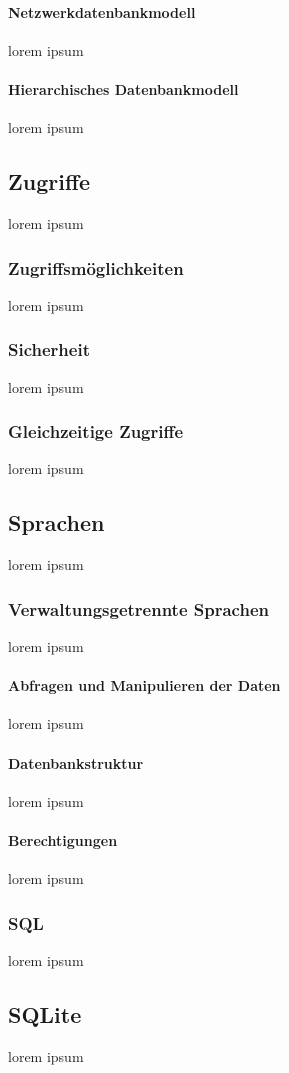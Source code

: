 \documentclass[12pt,a4paper]{report}
\begin{document}
\paragraph{Netzwerkdatenbankmodell}
lorem ipsum
\paragraph{Hierarchisches Datenbankmodell}
lorem ipsum
\subsection{Zugriffe}
lorem ipsum
\subsubsection{Zugriffsmöglichkeiten}
lorem ipsum
\subsubsection{Sicherheit}
lorem ipsum
\subsubsection{Gleichzeitige Zugriffe}
lorem ipsum 
\subsection{Sprachen}
lorem ipsum
\subsubsection{Verwaltungsgetrennte Sprachen}
lorem ipsum
\paragraph{Abfragen und Manipulieren der Daten}
lorem ipsum
\paragraph{Datenbankstruktur}
lorem ipsum
\paragraph{Berechtigungen}
lorem ipsum
\subsubsection{SQL}
lorem ipsum
\subsection{SQLite}
lorem ipsum
\end{document}
